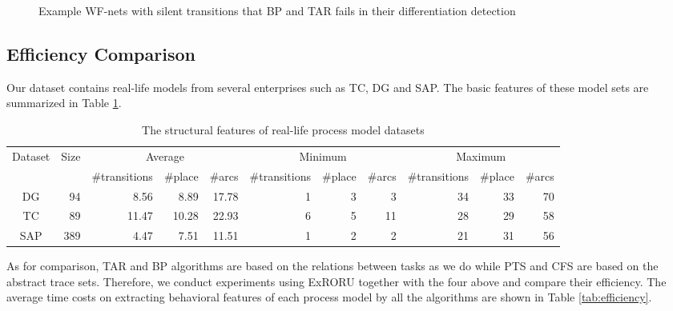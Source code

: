 \documentclass{llncs}
\begin{document}
\begin{figure}[htbp]
{\begin{minipage}[b]{0.27\textwidth}
	\end{minipage}
	\label{fig:silentExampleC}
}
\caption{Example WF-nets with silent transitions that BP and TAR fails in their differentiation detection\label{fig:silentExamples}}
\end{figure}

\subsection{Efficiency Comparison}\label{subsec:efficiency}
Our dataset contains real-life models from several enterprises such as TC, DG and SAP. The basic features of these model sets are summarized in Table \ref{tab:datasets}.

\begin{table}[htbp]
\centering
\caption{The structural features of real-life process model datasets\label{tab:datasets}}
\scriptsize
\begin{tabular}{|c|r|r|r|r|r|r|r|r|r|r|} \hline
	\multicolumn{1}{|c|}{\multirow{2}{*}{Dataset}} & \multicolumn{1}{c|}{\multirow{2}{*}{Size}} & \multicolumn{3}{|c}{Average} & \multicolumn{3}{|c}{Minimum} & \multicolumn{3}{|c|}{Maximum}\\ \cline{3-11}
	\multicolumn{1}{|c|}{} & \multicolumn{1}{c|}{} & \multicolumn{1}{c|}{\#transitions} & \multicolumn{1}{c|}{\#place} & \multicolumn{1}{c|}{\#arcs} & \multicolumn{1}{c|}{\#transitions} & \multicolumn{1}{c|}{\#place} & \multicolumn{1}{c|}{\#arcs} & \multicolumn{1}{c|}{\#transitions} & \multicolumn{1}{c|}{\#place} & \multicolumn{1}{c|}{\#arcs}\\ \hline
	DG & 94 & 8.56 & 8.89 & 17.78 & 1 & 3 & 3 & 34 & 33 & 70 \\ \hline
	TC & 89 & 11.47 & 10.28 & 22.93 & 6 & 5 & 11 & 28 & 29 & 58 \\ \hline
	SAP & 389 & 4.47 & 7.51 & 11.51 & 1 & 2 & 2 & 21 & 31 & 56 \\ \hline
\end{tabular}
\end{table}

As for comparison, TAR and BP algorithms are based on the relations between tasks as we do while PTS and CFS are based on the abstract trace sets. Therefore, we conduct experiments using ExRORU together with the four above and compare their efficiency. The average time costs on extracting behavioral features of each process model by all the algorithms are shown in Table \ref{tab:efficiency}.
\end{document}
